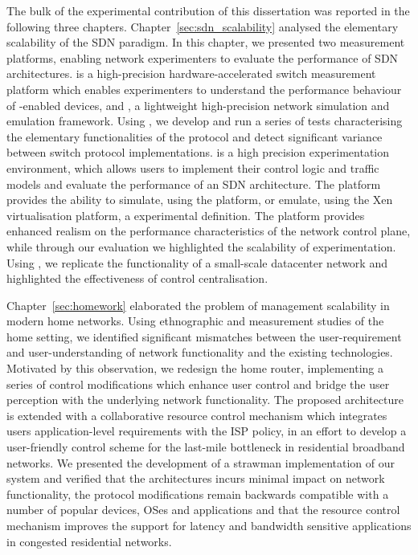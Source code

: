 The bulk of the experimental contribution of this dissertation was reported in
the following three chapters. Chapter~\ref{sec:sdn_scalability} analysed the
elementary scalability of the SDN paradigm. In this chapter, we presented two
measurement platforms, enabling network experimenters to evaluate the
performance of SDN architectures. \oflops is a high-precision
hardware-accelerated \of switch measurement platform which enables experimenters
to understand the performance behaviour of \of-enabled devices, and \sdnsim, a
lightweight high-precision network simulation and emulation framework. Using
\oflops, we develop and run a series of tests characterising the elementary
functionalities of the \of protocol and detect significant variance between
switch protocol implementations. \sdnsim is a high precision experimentation
environment, which allows users to implement their control logic and traffic
models and evaluate the performance of an SDN architecture. The platform
provides the ability to simulate, using the  platform, or emulate, using
the Xen virtualisation platform, a experimental definition.  The platform
provides enhanced realism on the performance characteristics of the network
control plane, while through our evaluation we highlighted the scalability of
experimentation.  Using \sdnsim, we replicate the functionality of a small-scale
datacenter network and highlighted the effectiveness of control centralisation.

Chapter~\ref{sec:homework} elaborated the problem of management scalability in
modern home networks. Using ethnographic and measurement studies of the home
setting, we identified significant mismatches between the user-requirement and
user-understanding of network functionality and the existing technologies.
Motivated by this observation, we redesign the home router, implementing a
series of control modifications which enhance user control and bridge the user
perception with the underlying network functionality. The proposed architecture
is extended with a collaborative resource control mechanism which integrates
users application-level requirements with the ISP policy, in an effort to
develop a user-friendly control scheme for the last-mile bottleneck in
residential broadband networks. We presented the development of a strawman
implementation of our system and verified that the architectures incurs minimal
impact on network functionality, the protocol modifications remain
backwards compatible with a number of popular devices, OSes and applications and
that the resource control mechanism improves the support for latency and
bandwidth sensitive applications in congested residential networks. 

